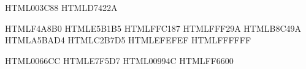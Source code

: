 \fancyheadoffset{0pt}            %
\setlength{\headheight}{14pt}    %


\usepackage{color}
\usepackage{xcolor}


\definecolor{xmublue}     {HTML}{003C88}
\definecolor{xmured}      {HTML}{D7422A}

\definecolor{myred}       {HTML}{F4A8B0}
\definecolor{mypink}      {HTML}{E5B1B5}
\definecolor{myorange}    {HTML}{FFC187}
\definecolor{myyellow}    {HTML}{FFF29A}
\definecolor{mygreen}     {HTML}{B8C49A}
\definecolor{myblue}      {HTML}{A5BAD4}
\definecolor{mypurple}    {HTML}{C2B7D5}
\definecolor{mygray}      {HTML}{EFEFEF}
\definecolor{mywhite}     {HTML}{FFFFFF}

\definecolor{linkblue}    {HTML}{0066CC}
\definecolor{linkred}     {HTML}{E7F5D7}
\definecolor{linkgreen}   {HTML}{00994C}
\definecolor{linkorange}  {HTML}{FF6600}


\usepackage[colorlinks=true,hyperfootnotes=true]{hyperref}

\makeatletter
\newcommand\setlabel[1]{\def\@currentlabelname{#1}\label{#1}}
\makeatother

\hypersetup{
    linkcolor=linkblue,    %
    citecolor=linkgreen,   %
    urlcolor=linkblue    %
}


\usepackage[bottom,hang,flushmargin]{footmisc}

\renewcommand{\footnoterule}{%
  \kern 10pt %
  \hrule width 0.4\textwidth height 0.4pt %
}

